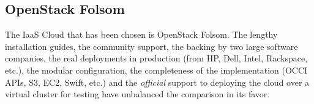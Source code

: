 \subsection{OpenStack Folsom}\label{subsec:openstackfolsom}

\noindent The IaaS Cloud that has been chosen is OpenStack Folsom. The lengthy installation guides, the community support, the backing by two large software companies, the real deployments in production (from HP, Dell, Intel, Rackspace, etc.), the modular configuration, the completeness of the implementation (OCCI APIs, S3, EC2, Swift, etc.) and the \emph{official} support to deploying the cloud over a virtual cluster for testing have unbalanced the comparison in its favor.
